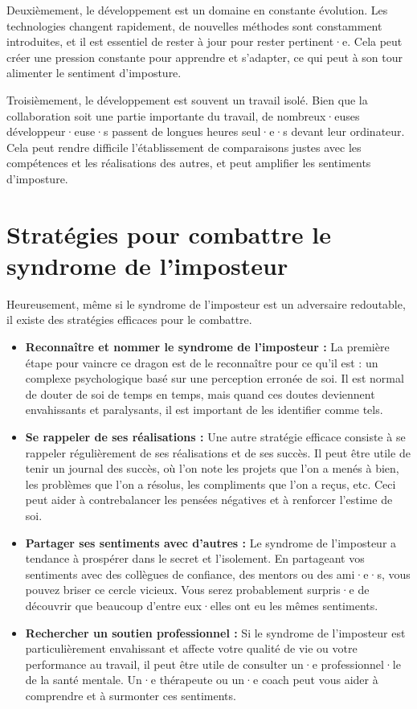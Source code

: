 Deuxièmement, le développement est un domaine en constante évolution. Les technologies changent rapidement, de nouvelles méthodes sont constamment introduites, et il est essentiel de rester à jour pour rester pertinent·e. Cela peut créer une pression constante pour apprendre et s'adapter, ce qui peut à son tour alimenter le sentiment d'imposture.

Troisièmement, le développement est souvent un travail isolé. Bien que la collaboration soit une partie importante du travail, de nombreux·euses développeur·euse·s passent de longues heures seul·e·s devant leur ordinateur. Cela peut rendre difficile l'établissement de comparaisons justes avec les compétences et les réalisations des autres, et peut amplifier les sentiments d'imposture.

\section{Stratégies pour combattre le syndrome de l'imposteur}

Heureusement, même si le syndrome de l'imposteur est un adversaire redoutable, il existe des stratégies efficaces pour le combattre.

\begin{itemize}
    \item \textbf{Reconnaître et nommer le syndrome de l'imposteur :} La première étape pour vaincre ce dragon est de le reconnaître pour ce qu'il est : un complexe psychologique basé sur une perception erronée de soi. Il est normal de douter de soi de temps en temps, mais quand ces doutes deviennent envahissants et paralysants, il est important de les identifier comme tels.
    \item \textbf{Se rappeler de ses réalisations :} Une autre stratégie efficace consiste à se rappeler régulièrement de ses réalisations et de ses succès. Il peut être utile de tenir un journal des succès, où l'on note les projets que l'on a menés à bien, les problèmes que l'on a résolus, les compliments que l'on a reçus, etc. Ceci peut aider à contrebalancer les pensées négatives et à renforcer l'estime de soi.
    \item \textbf{Partager ses sentiments avec d'autres :} Le syndrome de l'imposteur a tendance à prospérer dans le secret et l'isolement. En partageant vos sentiments avec des collègues de confiance, des mentors ou des ami·e·s, vous pouvez briser ce cercle vicieux. Vous serez probablement surpris·e de découvrir que beaucoup d'entre eux·elles ont eu les mêmes sentiments.
    \item \textbf{Rechercher un soutien professionnel :} Si le syndrome de l'imposteur est particulièrement envahissant et affecte votre qualité de vie ou votre performance au travail, il peut être utile de consulter un·e professionnel·le de la santé mentale. Un·e thérapeute ou un·e coach peut vous aider à comprendre et à surmonter ces sentiments.
\end{itemize}

